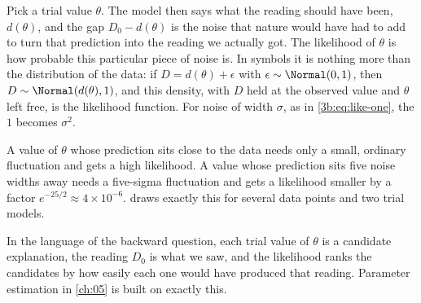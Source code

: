 \begin{keyidea}
Pick a trial value $\theta$. The model then says what the reading should have
been, $d(\theta)$, and the gap $D_0-d(\theta)$ is the noise that nature would
have had to add to turn that prediction into the reading we actually got. The
likelihood of $\theta$ is how probable this particular piece of noise is.
In symbols it is nothing more than the distribution of the data: if
$D=d(\theta)+\epsilon$ with $\epsilon\sim\Normal(0,1)$, then
$D\sim\Normal(d(\theta),1)$, and this density, with $D$ held at the observed
value and $\theta$ left free, is the likelihood function. For noise of width
$\sigma$, as in \eqref{3b:eq:like-one}, the $1$ becomes $\sigma^2$.
\end{keyidea}

A value of $\theta$ whose prediction sits close to the data needs only a
small, ordinary fluctuation and gets a high likelihood. A value whose
prediction sits five noise widths away needs a five-sigma fluctuation and
gets a likelihood smaller by a factor $e^{-25/2}\approx4\times10^{-6}$.
 draws exactly this for several data
points and two trial models.

In the language of the backward question, each trial value of $\theta$ is a
candidate explanation, the reading $D_0$ is what we saw, and the likelihood
ranks the candidates by how easily each one would have produced that reading.
Parameter estimation in \cref{ch:05} is built on exactly this.

